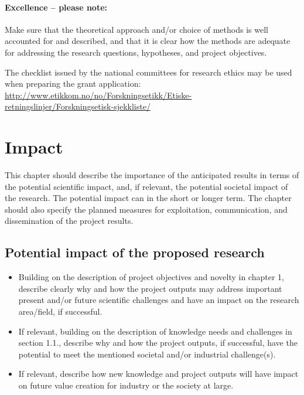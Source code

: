 \documentclass[11pt,a4paper,british]{article}
\begin{document}
\paragraph{Excellence -- please note:}
Make sure that the theoretical approach and/or choice of methods is well
accounted for and described, and that it is clear how the methods are adequate
for addressing the research questions, hypotheses, and project objectives.

The checklist issued by the national committees for research ethics may be
used when preparing the grant application:
\url{http://www.etikkom.no/no/Forskningsetikk/Etiske-retningslinjer/Forskningsetisk-sjekkliste/}

\section{Impact}
This chapter should describe the importance of the anticipated results in terms
of the potential scientific impact, and, if relevant, the potential societal
impact of the research. The potential impact can in the short or longer term.
The chapter should also specify the planned measures for exploitation,
communication, and dissemination of the project results.

\subsection{Potential impact of the proposed research}
\begin{itemize}
    \item Building on the description of project objectives and novelty in
        chapter 1, describe clearly why and how the project outputs may address
        important present and/or future scientific challenges and have an
        impact on the research area/field, if successful.
    \item If relevant, building on the description of knowledge needs and
        challenges in section 1.1., describe why and how the project outputs,
        if successful, have the potential to meet the mentioned societal and/or
        industrial challenge(s).
    \item If relevant, describe how new knowledge and project outputs will have
        impact on future value creation for industry or the society at large.
\end{itemize}
\end{document}
